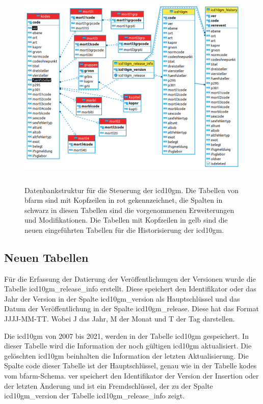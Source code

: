\clearpage	

\begin{figure}[ht]
	\centering
	\includegraphics[height=10cm]{figures/icdSqlSchema}
	\caption[Datenbankstruktur]{Datenbankstruktur für die Steuerung der \ac{icd10gm}. Die Tabellen von \ac{bfarm} sind mit Kopfzeilen in rot gekennzeichnet, die Spalten in schwarz in diesen Tabellen sind die vorgenommenen Erweiterungen und Modifikationen. Die Tabellen mit Kopfzeilen in gelb sind die neuen eingeführten Tabellen für die Historisierung der \ac{icd10gm}.}
	\label{fig:reldb2}
\end{figure}

\subsection{Neuen Tabellen} \label{subsec:newtables}

Für die Erfassung der Datierung der Veröffentlichungen der Versionen wurde die Tabelle \glqq\textsf{icd10gm\_release\_info}\grqq{} erstellt. Diese speichert den Identifikator oder das Jahr der Version in der Spalte \glqq\textsf{icd10gm\_version}\grqq{} als Hauptschlüssel und das Datum der Veröffentlichung in der Spalte \glqq\textsf{icd10gm\_release}\grqq{}. Diese hat das Format \glqq\textsf{JJJJ-MM-TT}\grqq{}. Wobei \glqq J\grqq{} das Jahr, \glqq M\grqq{} der Monat und \glqq T\grqq{} der Tag darstellen.

Die \ac{icd10gm} von 2007 bis 2021, werden in der Tabelle \glqq\textsf{icd10gm}\grqq{} gespeichert. In dieser Tabelle wird die Information der noch gültigen \ac{icd10gm} aktualisiert. Die gelöschten \ac{icd10gm} beinhalten die Information der letzten Aktualisierung. Die Spalte \textsf{code}\grqq{} dieser Tabelle ist der Hauptschlüssel, genau wie in der Tabelle \glqq\textsf{kodes}\grqq{} vom \ac{bfarm}-Schema. \glqq\textsf{ver}\grqq{} speichert den Identifikator der Version der Insertion oder der letzten Änderung und ist ein Fremdschlüssel, der zu der Spalte \glqq\textsf{icd10gm\_version}\grqq{} der Tabelle \glqq\textsf{icd10gm\_release\_info}\grqq{} zeigt.


